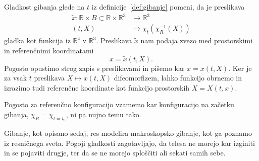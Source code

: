 \documentclass[12pt,a4paper,twoside]{article}
\theoremstyle{definition} %
\theoremstyle{plain} %
\numberwithin{equation}{section}
\newcommand{\R}{\mathbb R}
\newcommand{\vX}{X}
\newcommand{\vx}{x}
\begin{document}
Gladkost gibanja glede na $t$ iz definicije~\ref{def:gibanje} pomeni, da je
preslikava
\begin{align*}
  \tilde{x}\colon \R \times B \subset \R \times \R^3&\to \R^3 \\
  (t, \vX) &\mapsto \chi_t(\chi_R^{-1}(\vX))
\end{align*}
gladka kot funkcija iz $\R^4$ v $\R^3$.
Preslikava $\tilde x$ nam podaja zvezo med prostorskimi in referenčnimi
koordinatami
\[
  \vx = \tilde x(t, \vX).
\]
Pogosto opustimo strog zapis s preslikavami in pišemo kar $\vx = \vx(t, \vX)$.
Ker je za vsak $t$ preslikava $\vX \mapsto \vx(t, \vX)$ difeomorfizem, lahko funkcijo
obrnemo in izrazimo tudi referenčne koordinate kot funkcijo prostorskih $\vX = \vX(t, \vx)$.

Pogosto za referenčno konfiguracijo vzamemo kar konfiguracijo na začetku
gibanja, $\chi_R = \chi_{t=t_0}$, ni pa nujno temu tako.

Gibanje, kot opisano sedaj, res modelira makroskopsko gibanje, kot ga poznamo iz
resničnega sveta. Pogoji gladkosti zagotavljajo, da telesa ne morejo kar izginiti in se
pojaviti drugje, ter da se ne morejo sploščiti ali sekati samih sebe.
\end{document}
